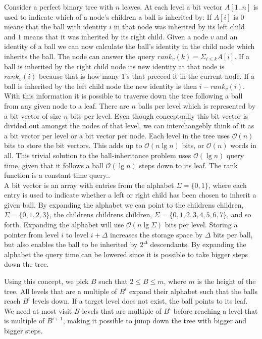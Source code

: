 Consider a perfect binary tree with $n$ leaves. At each level a bit vector $A[1..n]$ is used to indicate which of a node's children a ball is inherited by: If $A[i]$ is $0$ means that the ball with identity $i$ in that node was inherited by its left child and $1$ means that it was inherited by its right child. Given a node $v$ and an identity of a ball we can now calculate the ball's identity in the child node which inherits the ball. The node can answer the query $rank_v(k) = \Sigma_{i \leq k} A[i]$. If a ball is inherited by the right child node its new identity at that node is $rank_v(i)$ because that is how many $1$'s that preceed it in the current node. If a ball is inherited by the left child node the new identity is then $i-rank_v(i)$. With this information it is possible to traverse down the tree following a ball from any given node to a leaf. There are $n$ balls per level which is represented by a bit vector of size $n$ bits per level. Even though conceptually this bit vector is divided out amongst the nodes of that level, we can interchangebly think of it as a bit vector per level or a bit vector per node. Each level in the tree uses $\mathcal{O}(n)$ bits to store the bit vectors. This adds up to $\mathcal{O}(n \lg n)$ bits, or $\mathcal{O}(n)$ words in all. This trivial solution to the ball-inheritance problem uses $\mathcal{O}(\lg n)$ query time, given that it follows a ball $\mathcal{O}(\lg n)$ steps down to its leaf. The rank function is a constant time query.. \\


A bit vector is an array with entries from the alphabet $\Sigma = \{0,1\}$, where each entry is used to indicate whether a left or right child has been chosen to inherit a given ball. By expanding the alphabet we can point to the childrens children, $\Sigma = \{0,1,2,3\}$, the childrens childrens children, $\Sigma = \{0,1,2,3,4,5,6,7\}$, and so forth. Expanding the alphabet will use $\mathcal{O}(n \lg \Sigma)$ bits per level. Storing a pointer from level $i$ to level $i+\Delta$ increases the storage space by $\Delta$ bits per ball, but also enables the ball to be inherited by $2^\Delta$ descendants. By expanding the alphabet the query time can be lowered since it is possible to take bigger steps down the tree. 

Using this concept, we pick $B$ such that $2 \leq B \leq m$, where $m$ is the height of the tree. All levels that are a multiple of $B^i$ expand their alphabet such that the balls reach $B^i$ levels down. If a target level does not exist, the ball points to its leaf. We need at most visit $B$ levels that are multiple of $B^i$ before reaching a level that is multiple of $B^{i+1}$, making it possible to jump down the tree with bigger and bigger steps.

